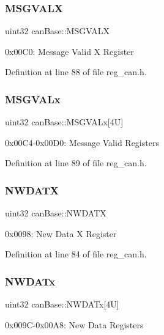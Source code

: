 \subsubsection{\texorpdfstring{M\+S\+G\+V\+A\+LX}{MSGVALX}}
{\footnotesize\ttfamily uint32 can\+Base\+::\+M\+S\+G\+V\+A\+LX}

0x00\+C0\+: Message Valid X Register 

Definition at line 88 of file reg\+\_\+can.\+h.

\mbox{\label{structcanBase_a8aaffd3d8e00ca1c922f6881b2dc9c13}} 
\subsubsection{\texorpdfstring{M\+S\+G\+V\+A\+Lx}{MSGVALx}}
{\footnotesize\ttfamily uint32 can\+Base\+::\+M\+S\+G\+V\+A\+Lx\mbox{[}4\+U\mbox{]}}

0x00\+C4-\/0x00\+D0\+: Message Valid Registers 

Definition at line 89 of file reg\+\_\+can.\+h.

\mbox{\label{structcanBase_afdd6b5f24e865ce2535c9494b431238a}} 
\subsubsection{\texorpdfstring{N\+W\+D\+A\+TX}{NWDATX}}
{\footnotesize\ttfamily uint32 can\+Base\+::\+N\+W\+D\+A\+TX}

0x0098\+: New Data X Register 

Definition at line 84 of file reg\+\_\+can.\+h.

\mbox{\label{structcanBase_a53f26fe98410415daaf61a3277884635}} 
\subsubsection{\texorpdfstring{N\+W\+D\+A\+Tx}{NWDATx}}
{\footnotesize\ttfamily uint32 can\+Base\+::\+N\+W\+D\+A\+Tx\mbox{[}4\+U\mbox{]}}

0x009\+C-\/0x00\+A8\+: New Data Registers 

